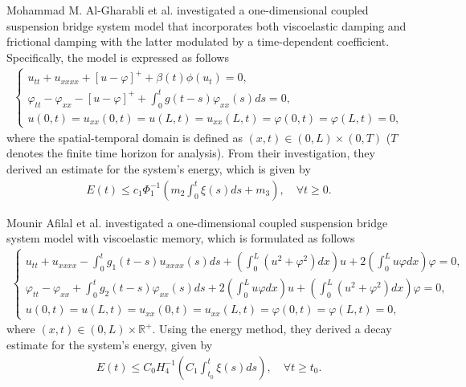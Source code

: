 \documentclass[11pt,reqno]{article}
\begin{document}
	Mohammad M. Al-Gharabli et al. \cite{MR4891851} investigated a one-dimensional coupled suspension bridge system model that incorporates both viscoelastic damping and frictional damping with the latter modulated by a time-dependent coefficient. Specifically, the model is expressed as follows
\begin{align*}
    \begin{cases}
        u_{tt} + u_{xxxx} + [u - \varphi]^+ + \beta(t)\phi(u_t) = 0, \\
        \varphi_{tt} - \varphi_{xx} - [u - \varphi]^+ + \int_0^t g(t-s)\varphi_{xx}(s)ds = 0,  \\
        u(0, t) = u_{xx}(0, t) = u(L, t) = u_{xx}(L, t) = \varphi(0, t) = \varphi(L, t) = 0,
    \end{cases}
\end{align*}
where the spatial-temporal domain is defined as $(x,t) \in (0,L)\times (0,T)$ ($T$ denotes the finite time horizon for analysis). From their investigation, they derived an estimate for the system's energy, which is given by
\begin{align*}
    E(t) \leq c_1 \Phi_1^{-1} \left( m_2 \int_0^t \xi(s)  ds + m_3 \right), \quad \forall t \geq 0.
\end{align*}
	
	 Mounir Afilal et al. \cite{MR4342054} investigated a one-dimensional coupled suspension bridge system model with viscoelastic memory, which is formulated as follows
\begin{align*}
    \begin{cases}
        u_{tt} + u_{xxxx} - \int_0^t g_1 (t-s) u_{xxxx}(s)  ds + \left( \int_0^L (u^2 + \varphi^2)  dx \right) u + 2 \left( \int_0^L u \varphi  dx \right)\varphi = 0,\\
        \varphi_{tt} - \varphi_{xx} + \int_0^t g_2 (t-s) \varphi_{xx}(s)  ds + 2 \left( \int_0^L u \varphi  dx \right) u + \left( \int_0^L (u^2 + \varphi^2)  dx \right) \varphi= 0, \\
        u(0,t)=u(L,t)=u_{xx}(0,t)=u_{xx}(L,t)=\varphi(0,t)=\varphi(L,t)=0,
    \end{cases}
\end{align*}
where $(x,t) \in (0,L)\times \mathbb{R}^+$. Using the energy method, they derived a decay estimate for the system's energy, given by
\begin{align*}
    E(t) \leq C_0 H_4^{-1} \left( C_1 \int_{t_0}^{t} \xi(s)  ds \right), \quad \forall t \geq t_0.
\end{align*}
\end{document}
